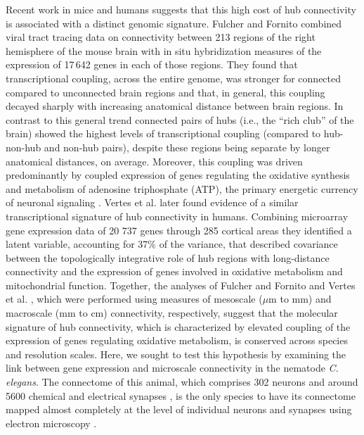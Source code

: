 \documentclass[10pt,letterpaper]{article}
\begin{document}
Recent work in mice and humans suggests that this high cost of hub connectivity is associated with a distinct genomic signature.
Fulcher and Fornito \cite{Fulcher:2016ck} combined viral tract tracing data on connectivity between 213 regions of the right hemisphere of the mouse brain \cite{Oh2014} with in situ hybridization measures of the expression of 17\,642 genes in each of those regions.
They found that transcriptional coupling, across the entire genome, was stronger for connected compared to unconnected brain regions and that, in general, this coupling decayed sharply with increasing anatomical distance between brain regions.
In contrast to this general trend connected pairs of hubs (i.e., the ``rich club'' of the brain) showed the highest levels of transcriptional coupling (compared to hub-non-hub and non-hub pairs), despite these regions being separate by longer anatomical distances, on average.
Moreover, this coupling was driven predominantly by coupled expression of genes regulating the oxidative synthesis and metabolism of adenosine triphosphate (ATP), the primary energetic currency of neuronal signaling \cite{Lennie:2003ia, Laughlin:2003vu}.
Vertes et al. \cite{Vertes2016a} later found evidence of a similar transcriptional signature of hub connectivity in humans.
Combining microarray gene expression data of 20 737 genes through 285 cortical areas they identified a latent variable, accounting for 37$\%$ of the variance, that described covariance between the topologically integrative role of hub regions with long-distance connectivity and the expression of genes involved in oxidative metabolism and mitochondrial function.
Together, the analyses of Fulcher and Fornito \cite{Fulcher:2016ck} and Vertes et al. \cite{Vertes2016a}, which were performed using measures of mesoscale ($\mu$m to mm) and macroscale (mm to cm) connectivity, respectively, suggest that the molecular signature of hub connectivity, which is characterized by elevated coupling of the expression of genes regulating oxidative metabolism, is conserved across species and resolution scales.
Here, we sought to test this hypothesis by examining the link between gene expression and microscale connectivity in the nematode \emph{C. elegans}.
The connectome of this animal, which comprises 302 neurons and around 5600 chemical and electrical synapses \cite{White:1986tx}, is the only species to have its connectome mapped almost completely at the level of individual neurons and synapses using electron microscopy \cite{White:1986tx, Varshney2011}.
\end{document}

